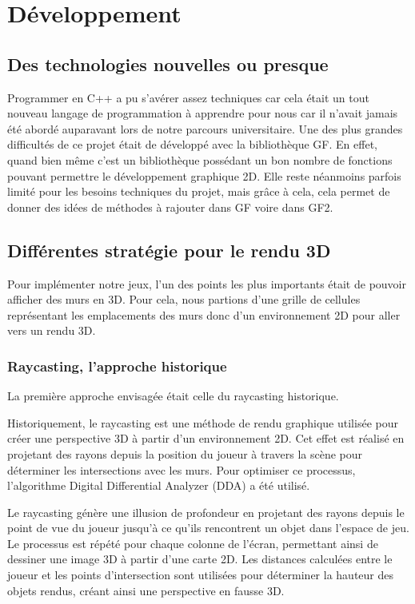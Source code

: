 \documentclass[11pt]{article}
\begin{document}
\section{Développement}
\subsection{Des technologies nouvelles ou presque}
Programmer en C++ a pu s'avérer assez techniques car cela était un tout nouveau langage de programmation à apprendre pour nous car il n'avait jamais été abordé auparavant lors de notre parcours universitaire.
Une des plus grandes difficultés de ce projet était de développé avec la bibliothèque GF. En effet, quand bien même c'est un bibliothèque possédant un bon nombre de fonctions pouvant permettre le développement graphique 2D. Elle reste néanmoins parfois limité pour les besoins techniques du projet, mais grâce à cela, cela permet de donner des idées de méthodes à rajouter dans GF voire dans GF2.\cite{GF2}

\subsection{Différentes stratégie pour le rendu 3D}
Pour implémenter notre jeux, l'un des points les plus importants était de pouvoir afficher des murs en 3D. Pour cela, nous partions d'une grille de cellules 
représentant les emplacements des murs donc d'un environnement 2D pour aller vers un rendu 3D.
\subsubsection{Raycasting, l'approche historique}
La première approche envisagée était celle du raycasting historique.

Historiquement, le raycasting est une méthode de rendu graphique utilisée pour créer une perspective 3D à partir d'un environnement 2D. Cet effet est réalisé en projetant des 
rayons depuis la position du joueur à travers la scène pour déterminer les intersections avec les murs. Pour optimiser ce
processus, l'algorithme Digital Differential Analyzer (DDA) a été utilisé.

Le raycasting génère une illusion de profondeur en projetant des rayons depuis le point de vue du joueur jusqu'à ce qu'ils rencontrent un 
objet dans l'espace de jeu. Le processus est répété pour chaque colonne de l'écran, permettant ainsi de dessiner une image 3D à partir d'une
carte 2D. Les distances calculées entre le joueur et les points d'intersection sont utilisées pour déterminer la hauteur des objets rendus, 
créant ainsi une perspective en fausse 3D.
\end{document}
